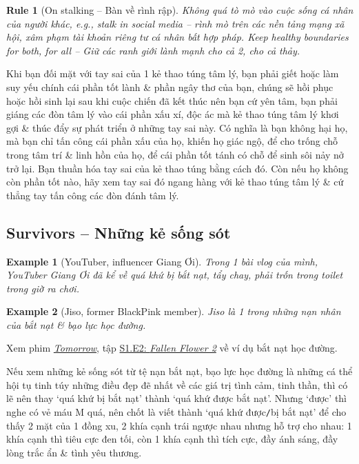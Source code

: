 \documentclass[12pt,oneside]{book}
\newtheorem{example}{Example}
\newtheorem{Rule}{Rule}
\begin{document}
\begin{Rule}[On stalking -- Bàn về rình rập]
	Không quá tò mò vào cuộc sống cá nhân của người khác, e.g., stalk in social media -- rình mò trên các nền tảng mạng xã hội, xâm phạm tài khoản  riêng tư cá nhân bất hợp pháp. Keep healthy boundaries for both, for all -- Giữ các ranh giới lành mạnh cho cả 2, cho cả thảy.
\end{Rule}
Khi bạn đối mặt với tay sai của 1 kẻ thao túng tâm lý, bạn phải giết hoặc làm suy yếu chính cái phần tốt lành \& phần ngây thơ của bạn, chúng sẽ hồi phục hoặc hồi sinh lại sau khi cuộc chiến đã kết thúc nên bạn cứ yên tâm, bạn phải giáng các đòn tâm lý vào cái phần xấu xí, độc ác mà kẻ thao túng tâm lý khơi gợi \& thúc đẩy sự phát triển ở những tay sai này. Có nghĩa là bạn không hại họ, mà bạn chỉ tấn công cái phần xấu của họ, khiến họ giác ngộ, để cho trống chỗ trong tâm trí \& linh hồn của họ, để cái phần tốt tánh có chỗ để sinh sôi nảy nở trở lại. Bạn thuần hóa tay sai của kẻ thao túng bằng cách đó. Còn nếu họ không còn phần tốt nào, hãy xem tay sai đó ngang hàng với kẻ thao túng tâm lý \& cứ thẳng tay tấn công các đòn đánh tâm lý.

\subsection{Survivors -- Những kẻ sống sót}

\begin{example}[YouTuber, influencer {\sc Giang Ơi}]
	Trong 1 bài vlog của mình, YouTuber {\sc Giang Ơi} đã kể về quá khứ bị bắt nạt, tẩy chay, phải trốn trong toilet trong giờ ra chơi.
\end{example}

\begin{example}[{\sc Jiso}, former BlackPink member]
	{\sc Jiso} là 1 trong những nạn nhân của bắt nạt \& bạo lực học đường.
\end{example}
Xem phim \href{https://www.imdb.com/title/tt18926162/}{\it Tomorrow}, tập \href{https://www.imdb.com/title/tt19355032/}{S1.E2: {\it Fallen Flower 2}} về ví dụ bắt nạt học đường.

Nếu xem những kẻ sống sót từ tệ nạn bắt nạt, bạo lực học đường là những cá thể hội tụ tinh túy những điều đẹp đẽ nhất về các giá trị tình cảm, tinh thần, thì có lẽ nên thay `quá khứ bị bắt nạt' thành `quá khứ được bắt nạt'. Nhưng `được' thì nghe có vẻ máu M quá, nên chốt là viết thành `quá khứ được{\tt/}bị bắt nạt' để cho thấy 2 mặt của 1 đồng xu, 2 khía cạnh trái ngược nhau nhưng hỗ trợ cho nhau: 1 khía cạnh thì tiêu cực đen tối, còn 1 khía cạnh thì tích cực, đầy ánh sáng, đầy lòng trắc ẩn \& tình yêu thương.
\end{document}
